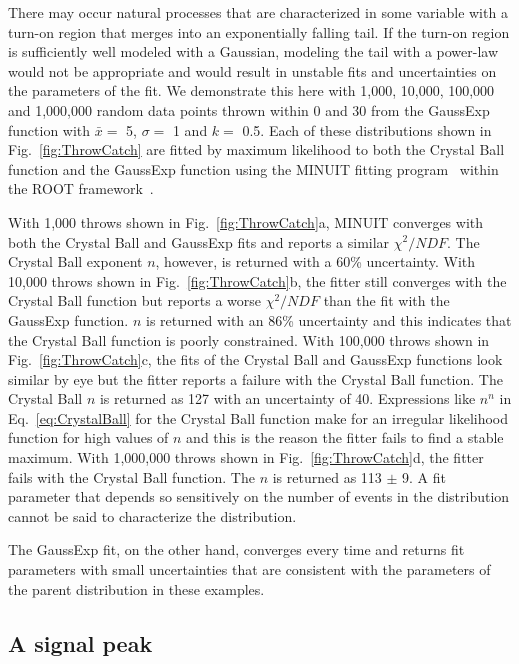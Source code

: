 \documentclass[10pt,letterpaper]{article}
\begin{document}
There may occur natural processes that are characterized in some variable with a turn-on region that merges into an exponentially falling tail. If the turn-on region is sufficiently well modeled with a Gaussian, modeling the tail with a power-law would not be appropriate and would result in unstable fits and uncertainties on the parameters of the fit. We demonstrate this here with 1,000, 10,000, 100,000 and 1,000,000 random data points thrown within 0 and 30 from the GaussExp function with $\bar{x} =$ 5, $\sigma =$ 1 and $k =$ 0.5. Each of these distributions shown in Fig.~\ref{fig:ThrowCatch} are fitted by maximum likelihood to both the Crystal Ball function and the GaussExp function using the MINUIT fitting program~\cite{JAMES1975343} within the ROOT framework~\cite{Antcheva20092499}.

With 1,000 throws shown in Fig.~\ref{fig:ThrowCatch}a, MINUIT converges with both the Crystal Ball and GaussExp fits and reports a similar $\chi^2/NDF$. The Crystal Ball exponent $n$, however, is returned with a 60\% uncertainty. With 10,000 throws shown in Fig.~\ref{fig:ThrowCatch}b, the fitter still converges with the Crystal Ball function but reports a worse $\chi^2/NDF$ than the fit with the GaussExp function. $n$ is returned with an 86\% uncertainty and this indicates that the Crystal Ball function is poorly constrained. With 100,000 throws shown in Fig.~\ref{fig:ThrowCatch}c, the fits of the Crystal Ball and GaussExp functions look similar by eye but the fitter reports a failure with the Crystal Ball function. The Crystal Ball $n$ is returned as 127 with an uncertainty of 40. Expressions like $n^n$ in Eq.~\ref{eq:CrystalBall} for the Crystal Ball function make for an irregular likelihood function for high values of $n$ and this is the reason the fitter fails to find a stable maximum. With 1,000,000 throws shown in Fig.~\ref{fig:ThrowCatch}d, the fitter fails with the Crystal Ball function. The $n$ is returned as 113 $\pm$ 9. A fit parameter that depends so sensitively on the number of events in the distribution cannot be said to characterize the distribution.

The GaussExp fit, on the other hand, converges every time and returns fit parameters with small uncertainties that are consistent with the parameters of the parent distribution in these examples.

\subsection{A signal peak}
\end{document}
